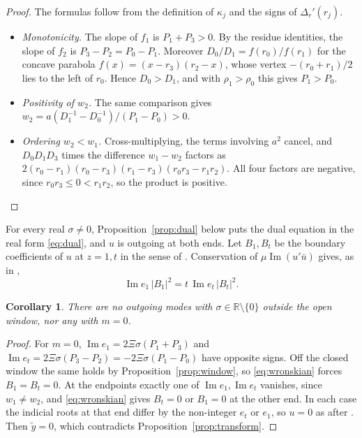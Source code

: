 \documentclass[11pt]{amsart}
\newtheorem{corollary}[theorem]{Corollary}
\theoremstyle{definition}
\theoremstyle{remark}
\numberwithin{equation}{section}
\newcommand{\R}{\mathbb{R}}
\renewcommand{\Im}{\operatorname{Im}}
\begin{document}
\begin{proof}
The formulas follow from the definition of $\kappa_j$ and the signs of $\Delta_r'(r_j)$.
\begin{itemize}
\item \emph{Monotonicity.} The slope of $f_1$ is $P_1+P_3>0$. By the residue identities, the slope of $f_2$ is
$P_3-P_2=P_0-P_1$. Moreover $D_0/D_1=f(r_0)/f(r_1)$ for the concave parabola $f(x)=(x-r_3)(r_2-x)$, whose vertex
$-(r_0+r_1)/2$ lies to the left of $r_0$. Hence $D_0>D_1$, and with $\rho_1>\rho_0$ this gives $P_1>P_0$.
\item \emph{Positivity of $w_2$.} The same comparison gives $w_2=a(D_1^{-1}-D_0^{-1})/(P_1-P_0)>0$.
\item \emph{Ordering $w_2<w_1$.} Cross-multiplying, the terms involving $a^2$ cancel, and $D_0D_1D_3$ times the
difference $w_1-w_2$ factors as $2(r_0-r_1)(r_0-r_3)(r_1-r_3)(r_0r_3-r_1r_2)$. All four factors are negative,
since $r_0r_3\le0<r_1r_2$, so the product is positive. \qedhere
\end{itemize}
\end{proof}

For every real $\sigma\ne0$, Proposition~\ref{prop:dual} below puts the dual equation in the real form
\eqref{eq:dual}, and $u$ is outgoing at both ends. Let $B_1,B_t$ be the boundary coefficients of $u$ at $z=1,t$ in
the sense of \cite[(3.5)]{Hin26}. Conservation of $\mu\Im(u'\bar u)$ gives, as in \cite[\S3]{Hin26},
\begin{equation}\label{eq:wronskian}
\Im e_1\,|B_1|^2=t\,\Im e_t\,|B_t|^2.
\end{equation}

\begin{corollary}\label{cor:outside}
There are no outgoing modes with $\sigma\in\R\setminus\{0\}$ outside the open window, nor any with $m=0$.
\end{corollary}
\begin{proof}
For $m=0$, $\Im e_1=2\Xi\sigma(P_1+P_3)$ and $\Im e_t=2\Xi\sigma(P_3-P_2)=-2\Xi\sigma(P_1-P_0)$ have opposite signs.
Off the closed window the same holds by Proposition~\ref{prop:window}, so \eqref{eq:wronskian} forces
$B_1=B_t=0$. At the endpoints exactly one of $\Im e_1,\Im e_t$ vanishes, since $w_1\ne w_2$, and
\eqref{eq:wronskian} gives $B_t=0$ or $B_1=0$ at the other end. In each case the indicial roots at that end differ by
the non-integer $e_t$ or $e_1$, so $u=0$ as after \cite[(3.6)]{Hin26}. Then $\tilde y=0$, which contradicts
Proposition~\ref{prop:transform}.
\end{proof}
\end{document}
